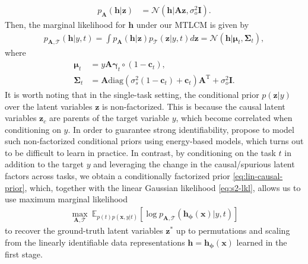 \documentclass[nohyperref]{article}
\theoremstyle{plain}
\theoremstyle{definition}
\theoremstyle{remark}
\begin{document}
\begin{align}\label{eq:s2-lkl}
    p_{\mathbf{A}}(\mathbf{h}|\mathbf{z}) & =\mathcal{N}(\mathbf{h}|\mathbf{A}\mathbf{z},\sigma_{o}^{2}\mathbf{I}).
\end{align}
Then, the marginal likelihood for $\mathbf{h}$ under our MTLCM is given by
\begin{align}\label{eq:s2-mlkl}
    p_{\mathbf{A},\mathcal{T}}(\mathbf{h}|y,t)=\int p_{\mathbf{A}}(\mathbf{h}|\mathbf{z})p_{\mathcal{T}}(\mathbf{z}|y,t)d\mathbf{z}
    =\mathcal{N}(\mathbf{h}|\boldsymbol{\mu}_t,\boldsymbol{\Sigma}_t),
\end{align}
where
\begin{align}
    \boldsymbol{\mu}_t &= y\mathbf{A}\boldsymbol{\gamma}_t\circ(1-\mathbf{c}_t),\\
    \boldsymbol{\Sigma}_t &= \mathbf{A}\text{diag}(\sigma_{s}^{2}(1-\mathbf{c}_t)+\mathbf{c}_t)\mathbf{A}^{\text{T}}+\sigma_o^2\mathbf{I}.
\end{align}
It is worth noting that in the single-task setting, the conditional prior $p(\mathbf{z}|y)$ over the latent variables $\mathbf{z}$ is non-factorized. This is because the causal latent variables $\mathbf{z}_c$ are parents of the target variable $y$, which become correlated when conditioning on $y$. In order to guarantee strong identifiability, \citet{Lu_Wu_Hernandez-Lobato_Scholkopf_2022} propose to model such non-factorized conditional priors using energy-based models, which turns out to be difficult to learn in practice. In contrast, by conditioning on the task $t$ in addition to the target $y$ and leveraging the change in the causal/spurious latent factors across tasks, we obtain a conditionally factorized prior \eqref{eq:lin-causal-prior}, which, together with the linear Gaussian likelihood \eqref{eq:s2-lkl}, allows us to use maximum marginal likelihood
\begin{align}
    \max_{\mathbf{A},\mathcal{T}}~\mathbb{E}_{p(t)p(\mathbf{x},y|t)}[\log p_{\mathbf{A},\mathcal{T}}(\mathbf{h}_{\boldsymbol{\phi}}(\mathbf{x})|y,t)]
\end{align}
to recover the ground-truth latent variables $\mathbf{z}^*$ up to permutations and scaling from the linearly identifiable data representations $\mathbf{h}=\mathbf{h}_{\boldsymbol{\phi}}(\mathbf{x})$ learned in the first stage.
\end{document}
